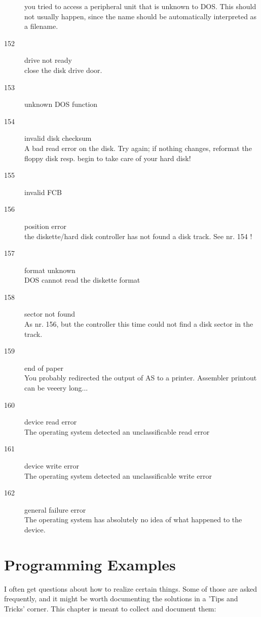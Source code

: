 \documentclass[12pt,twoside]{report}
\newcommand{\asname}{{AS}}
\begin{document}
\begin{description}
{         you tried to access a peripheral unit that is unknown to DOS. This
         should not usually happen, since the name should be automatically
         interpreted as a filename.}
\item[152]{drive not ready\\
         close the disk drive door.}
\item[153]{unknown DOS function}
\item[154]{invalid disk checksum\\
         A bad read error on the disk. Try again; if nothing changes,
         reformat the floppy disk resp. begin to take care of your hard
         disk!}
\item[155]{invalid FCB}
\item[156]{position error\\
         the diskette/hard disk controller has not found a disk track. See
         nr. 154 !}
\item[157]{format unknown\\
         DOS cannot read the diskette format}
\item[158]{sector not found\\
         As nr. 156, but the controller this time could not find a disk
         sector in the track.}
\item[159]{end of paper\\
         You probably redirected the output of \asname{} to a printer. Assembler
         printout can be veeery long...}
\item[160]{device read error\\
         The operating system detected an unclassificable read error}
\item[161]{device write error\\
         The operating system detected an unclassificable write error}
\item[162]{general failure error\\
         The operating system has absolutely no idea of what happened to the
         device.}
\end{description}


\cleardoublepage
\chapter{Programming Examples}

I often get questions about how to realize certain things. Some of those are
asked frequently, and it might be worth documenting the solutions in a 'Tips
and Tricks' corner.  This chapter is meant to collect and document them:
\end{document}
